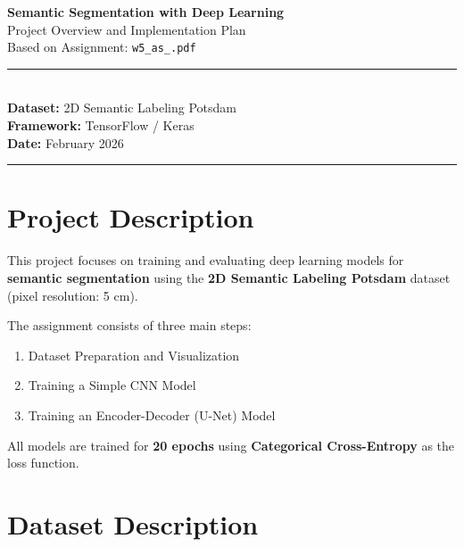 \documentclass[12pt,a4paper]{article}
\begin{document}
\begin{titlepage}
    \centering
    \vspace*{2cm}
    {\LARGE \textbf{Semantic Segmentation with Deep Learning}}\\[0.5cm]
    {\Large Project Overview and Implementation Plan}\\[1cm]
    {\large Based on Assignment: \texttt{w5\_as\_.pdf}}\\[2cm]
    \rule{\textwidth}{0.4pt}\\[0.5cm]
    {\normalsize \textbf{Dataset:} 2D Semantic Labeling Potsdam}\\[0.2cm]
    {\normalsize \textbf{Framework:} TensorFlow / Keras}\\[0.2cm]
    {\normalsize \textbf{Date:} February 2026}\\[0.5cm]
    \rule{\textwidth}{0.4pt}
    \vfill
\end{titlepage}

\tableofcontents
\newpage

\section{Project Description}

This project focuses on training and evaluating deep learning models for
\textbf{semantic segmentation} using the \textbf{2D Semantic Labeling Potsdam} dataset
(pixel resolution: 5 cm).

The assignment consists of three main steps:
\begin{enumerate}
    \item Dataset Preparation and Visualization
    \item Training a Simple CNN Model
    \item Training an Encoder-Decoder (U-Net) Model
\end{enumerate}

All models are trained for \textbf{20 epochs} using
\textbf{Categorical Cross-Entropy} as the loss function.

\section{Dataset Description}
\end{document}
